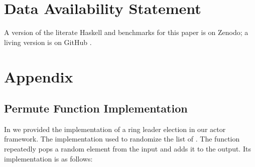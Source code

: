 \documentclass[sigplan,screen]{acmart}
\begin{document}
\section*{Data Availability Statement}

A version of the literate Haskell and benchmarks for this paper
is on Zenodo; a living version is on GitHub \cite{hakkellartifact}.





\appendix

\section{Appendix}

\subsection{Permute Function Implementation}
\label{apx:permute-impl}

In  we provided the implementation of a ring
leader election in our actor framework.
%
The implementation used  to randomize the list of
.
%
The  function repeatedly pops a random element from the input and adds it to the output.
%
Its implementation is as follows:
%
\end{document}

